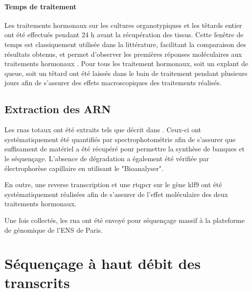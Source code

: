 \documentclass[../main.tex]{subfiles}
\begin{document}
\paragraph{Temps de traitement}
Les traitements hormonaux sur les cultures organotypiques et les têtards entier ont été effectués pendant 24 h avant la récupération des tissus.
Cette fenêtre de temps est classiquement utilisée dans la littérature, facilitant la comparaison des résultats obtenus, et permet d'observer les premières réponses moléculaires aux traitements hormonaux .
Pour tous les traitement hormonaux, soit un explant de queue, soit un têtard ont été laissés dans le bain de traitement pendant plusieurs jours afin de s'assurer des effets macroscopiques des traitements réalisés.

\subsection{Extraction des ARN}

Les \glspl{rna} totaux ont été extraits tels que décrit dans \citet{Bilesimo2011}.
Ceux-ci ont systématiquement été quantifiés par spectrophotométrie afin de s'assurer que suffisament de matériel a été récupéré pour permettre la synthèse de banques et le séquençage.
L'absence de dégradation a également été vérifiée par électrophorèse capillaire en utilisant le "Bioanalyser".
\par
En outre, une reverse transcription et une \gls{rtqpcr} sur le gène \gls{klf9} ont été systématiquement réalisées afin de s'assurer de l'effet moléculaire des deux traitements hormonaux.
\\
\par
Une fois collectés, les \gls{rna} ont été envoyé pour séquençage massif à la plateforme de génomique de l'ENS de Paris.




\section{Séquençage à haut débit des transcrits}
\end{document}
